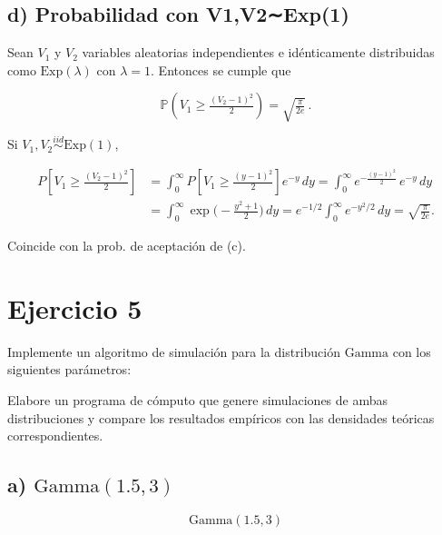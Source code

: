 \documentclass[10pt,a4paper]{article}
\let\ge\geqslant
\let\geq\geqslant
\let\ge\geq
\let\oldsection\section
\renewcommand{\section}{%
      \clearpage
      \thispagestyle{myfancy}%
      \oldsection
    }
\begin{document}
    \hypertarget{d-probabilidad-con-v1v2exp1}{%
\subsection{d) Probabilidad con
V1,V2∼Exp(1)}\label{d-probabilidad-con-v1v2exp1}}

    Sean \(V_1\) y \(V_2\) variables aleatorias independientes e
idénticamente distribuidas como \(\text{Exp}(\lambda)\) con
\(\lambda = 1\). Entonces se cumple que

\[
\mathbb{P}\!\left( V_{1} \ge \tfrac{(V_{2}-1)^{2}}{2} \right)
= \sqrt{\tfrac{\pi}{2e}}\,.
\]

    Si \(V_1,V_2\overset{iid}{\sim}\mathrm{Exp}(1)\),

\[
\begin{aligned}
P\!\left[V_1\ge \frac{(V_2-1)^2}{2}\right]
&=\int_0^\infty P\!\left[V_1\ge \tfrac{(y-1)^2}{2}\right] e^{-y}\,dy
=\int_0^\infty e^{-\frac{(y-1)^2}{2}}\,e^{-y}\,dy\\
&=\int_0^\infty \exp\!\Big(-\tfrac{y^2+1}{2}\Big)\,dy
=e^{-1/2}\!\int_0^\infty e^{-y^2/2}\,dy
=\boxed{\sqrt{\frac{\pi}{2e}}}.
\end{aligned}
\]

Coincide con la prob. de aceptación de (c).

    \hypertarget{ejercicio-5}{%
\section{Ejercicio 5}\label{ejercicio-5}}

    Implemente un algoritmo de simulación para la distribución
\(\text{Gamma}\) con los siguientes parámetros:

    Elabore un programa de cómputo que genere simulaciones de ambas
distribuciones y compare los resultados empíricos con las densidades
teóricas correspondientes.

    \hypertarget{a-textgamma1.5-3}{%
\subsection{\texorpdfstring{a)
\(\text{Gamma}(1.5, 3)\)}{a) \textbackslash text\{Gamma\}(1.5, 3)}}\label{a-textgamma1.5-3}}

    \[
\text{Gamma}(1.5, 3)
\]
\end{document}
